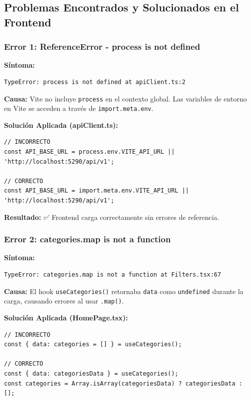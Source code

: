 \documentclass[12pt,a4paper]{article}
\begin{document}
\subsection{Problemas Encontrados y Solucionados en el Frontend}

\subsubsection{Error 1: ReferenceError - process is not defined}

\textbf{Síntoma:}
\begin{verbatim}
TypeError: process is not defined at apiClient.ts:2
\end{verbatim}

\textbf{Causa:}
Vite no incluye \texttt{process} en el contexto global. Las variables de entorno en Vite se acceden a través de \texttt{import.meta.env}.

\textbf{Solución Aplicada (apiClient.ts):}
\begin{lstlisting}
// INCORRECTO
const API_BASE_URL = process.env.VITE_API_URL || 'http://localhost:5290/api/v1';

// CORRECTO
const API_BASE_URL = import.meta.env.VITE_API_URL || 'http://localhost:5290/api/v1';
\end{lstlisting}

\textbf{Resultado:} ✅ Frontend carga correctamente sin errores de referencia.

\subsubsection{Error 2: categories.map is not a function}

\textbf{Síntoma:}
\begin{verbatim}
TypeError: categories.map is not a function at Filters.tsx:67
\end{verbatim}

\textbf{Causa:}
El hook \texttt{useCategories()} retornaba \texttt{data} como \texttt{undefined} durante la carga, causando errores al usar \texttt{.map()}.

\textbf{Solución Aplicada (HomePage.tsx):}
\begin{lstlisting}
// INCORRECTO
const { data: categories = [] } = useCategories();

// CORRECTO
const { data: categoriesData } = useCategories();
const categories = Array.isArray(categoriesData) ? categoriesData : [];
\end{lstlisting}
\end{document}

